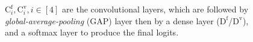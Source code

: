 \begin{figure}[b]

\caption{\small{$\textrm{C}_i^{\text{f}},\textrm{C}_i^{\text{v}},i\in[4]$ are the convolutional layers, which are followed by \emph{global-average-pooling} (GAP) layer then by a dense layer ($\textrm{D}^{\text{f}}$/$\textrm{D}^{\text{v}}$), and a softmax layer to produce the final logits.}} %
\label{fig:ablation}
\end{figure}
